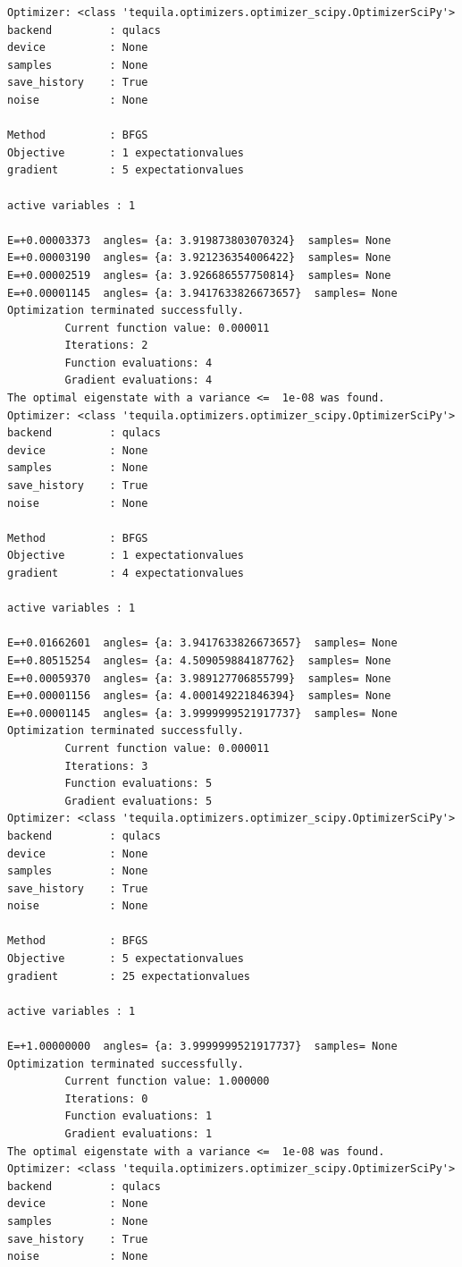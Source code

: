 \documentclass[
  letterpaper,
  DIV=11,
  numbers=noendperiod]{scrartcl}
\begin{document}
\begin{verbatim}
Optimizer: <class 'tequila.optimizers.optimizer_scipy.OptimizerSciPy'> 
backend         : qulacs
device          : None
samples         : None
save_history    : True
noise           : None

Method          : BFGS
Objective       : 1 expectationvalues
gradient        : 5 expectationvalues

active variables : 1

E=+0.00003373  angles= {a: 3.919873803070324}  samples= None
E=+0.00003190  angles= {a: 3.921236354006422}  samples= None
E=+0.00002519  angles= {a: 3.926686557750814}  samples= None
E=+0.00001145  angles= {a: 3.9417633826673657}  samples= None
Optimization terminated successfully.
         Current function value: 0.000011
         Iterations: 2
         Function evaluations: 4
         Gradient evaluations: 4
The optimal eigenstate with a variance <=  1e-08 was found.
Optimizer: <class 'tequila.optimizers.optimizer_scipy.OptimizerSciPy'> 
backend         : qulacs
device          : None
samples         : None
save_history    : True
noise           : None

Method          : BFGS
Objective       : 1 expectationvalues
gradient        : 4 expectationvalues

active variables : 1

E=+0.01662601  angles= {a: 3.9417633826673657}  samples= None
E=+0.80515254  angles= {a: 4.509059884187762}  samples= None
E=+0.00059370  angles= {a: 3.989127706855799}  samples= None
E=+0.00001156  angles= {a: 4.000149221846394}  samples= None
E=+0.00001145  angles= {a: 3.9999999521917737}  samples= None
Optimization terminated successfully.
         Current function value: 0.000011
         Iterations: 3
         Function evaluations: 5
         Gradient evaluations: 5
Optimizer: <class 'tequila.optimizers.optimizer_scipy.OptimizerSciPy'> 
backend         : qulacs
device          : None
samples         : None
save_history    : True
noise           : None

Method          : BFGS
Objective       : 5 expectationvalues
gradient        : 25 expectationvalues

active variables : 1

E=+1.00000000  angles= {a: 3.9999999521917737}  samples= None
Optimization terminated successfully.
         Current function value: 1.000000
         Iterations: 0
         Function evaluations: 1
         Gradient evaluations: 1
The optimal eigenstate with a variance <=  1e-08 was found.
Optimizer: <class 'tequila.optimizers.optimizer_scipy.OptimizerSciPy'> 
backend         : qulacs
device          : None
samples         : None
save_history    : True
noise           : None


\end{verbatim}
\end{document}
